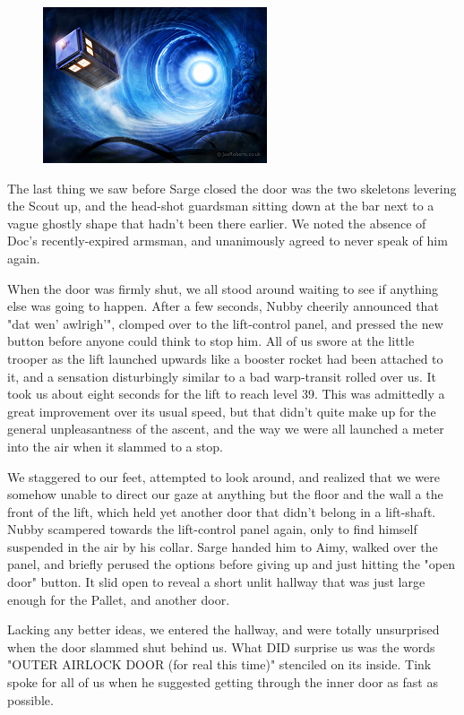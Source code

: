 \begin{figure}
	\begin{center}
		\includegraphics[width=\figwidth]{pics/15/62.png}
	\end{center}
\end{figure}
The last thing we saw before Sarge closed the door was the two skeletons levering the Scout up, and the head-shot guardsman sitting down at the bar next to a vague ghostly shape that hadn't been there earlier. 
We noted the absence of Doc's recently-expired armsman, and unanimously agreed to never speak of him again.

When the door was firmly shut, we all stood around waiting to see if anything else was going to happen. 
After a few seconds, Nubby cheerily announced that "dat wen' awlrigh'", clomped over to the lift-control panel, and pressed the new button before anyone could think to stop him. 
All of us swore at the little trooper as the lift launched upwards like a booster rocket had been attached to it, and a sensation disturbingly similar to a bad warp-transit rolled over us. 
It took us about eight seconds for the lift to reach level 39. 
This was admittedly a great improvement over its usual speed, but that didn't quite make up for the general unpleasantness of the ascent, and the way we were all launched a meter into the air when it slammed to a stop.

We staggered to our feet, attempted to look around, and realized that we were somehow unable to direct our gaze at anything but the floor and the wall a the front of the lift, which held yet another door that didn't belong in a lift-shaft. 
Nubby scampered towards the lift-control panel again, only to find himself suspended in the air by his collar. 
Sarge handed him to Aimy, walked over the panel, and briefly perused the options before giving up and just hitting the "open door" button. 
It slid open to reveal a short unlit hallway that was just large enough for the Pallet, and another door. 


Lacking any better ideas, we entered the hallway, and were totally unsurprised when the door slammed shut behind us. 
What DID surprise us was the words "OUTER AIRLOCK DOOR (for real this time)" stenciled on its inside. 
Tink spoke for all of us when he suggested getting through the inner door as fast as possible.

